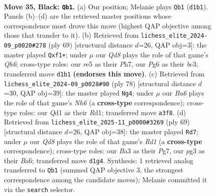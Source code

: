 \documentclass[11pt]{article}
\begin{document}
\clearpage

\begin{figure}[p]\centering
\begin{subfigure}{0.46\textwidth}\centering
\resizebox{\linewidth}{!}{%
\newchessgame
\chessboard[
  setfen={8/pp4kp/6p1/3BR3/8/b5P1/5PKP/3q4 b - - 5 35},
  showmover=false,
  pgfstyle=straightmove, color=movearrow, markmove={d1-b1}
]}
\caption{}
\end{subfigure}\hfill
\begin{subfigure}{0.46\textwidth}\centering
\resizebox{\linewidth}{!}{%
\newchessgame
\chessboard[
  setfen={8/1p3k1p/p2p2p1/8/8/1PB4q/1PP5/1K3R2 b - - 1 35},
  showmover=false,
  pgfstyle=straightmove, color=movearrow, markmove={h3-f1}
]}
\caption{}
\end{subfigure}
\\[4pt]
\begin{subfigure}{0.46\textwidth}\centering
\resizebox{\linewidth}{!}{%
\newchessgame
\chessboard[
  setfen={8/1pk5/2p4N/r2b4/8/2P2PKP/6P1/3R4 w - - 0 40},
  showmover=false,
  pgfstyle=straightmove, color=movearrow, markmove={h6-g4}
]}
\caption{}
\end{subfigure}\hfill
\begin{subfigure}{0.46\textwidth}\centering
\resizebox{\linewidth}{!}{%
\newchessgame
\chessboard[
  setfen={3r4/5kp1/b4p2/8/3Bp1P1/4P1K1/1R3P2/8 b - - 0 35},
  showmover=false,
  pgfstyle=straightmove, color=movearrow, markmove={d8-d7}
]}
\caption{}
\end{subfigure}
\caption{\textbf{Move 35, Black: \texttt{Qb1}.} (a) Our position; Melanie plays \texttt{Qb1} (\texttt{d1b1}). Panels (b)--(d) are the retrieved master positions whose correspondence most drove this move (highest QAP objective among those that transfer to it). (b) Retrieved from \texttt{lichess\_elite\_2024-09\_p0020\#278} (ply 69) [structural distance $d$=26, QAP obj=3]: the master played \texttt{Qxf1+}; under $\mu$ our \emph{Qd8} plays the role of that game's \emph{Qh6}; cross-type roles: our \emph{r}e5 as their \emph{P}h7, our \emph{P}g6 as their \emph{b}c3; transferred move \texttt{d1b1} \textbf{(endorses this move)}. (c) Retrieved from \texttt{lichess\_elite\_2024-09\_p0028\#90} (ply 78) [structural distance $d$=30, QAP obj=39]: the master played \texttt{Ng4}; under $\mu$ our \emph{Ba6} plays the role of that game's \emph{Nh6} (a \textbf{cross-type} correspondence); cross-type roles: our \emph{Q}d1 as their \emph{R}d1; transferred move \texttt{a3f8}. (d) Retrieved from \texttt{lichess\_elite\_2025-11\_p0000\#3269} (ply 69) [structural distance $d$=26, QAP obj=38]: the master played \texttt{Rd7}; under $\mu$ our \emph{Qd8} plays the role of that game's \emph{Rd1} (a \textbf{cross-type} correspondence); cross-type roles: our \emph{B}a3 as their \emph{P}g7, our \emph{p}g3 as their \emph{B}a6; transferred move \texttt{d1g4}. Synthesis: 1 retrieved analog transferred to \texttt{Qb1} (summed QAP objective 3, the strongest correspondence among the candidate moves); Melanie committed it via the \texttt{search} selector.}
\label{fig:thought-m69}
\end{figure}
\end{document}
